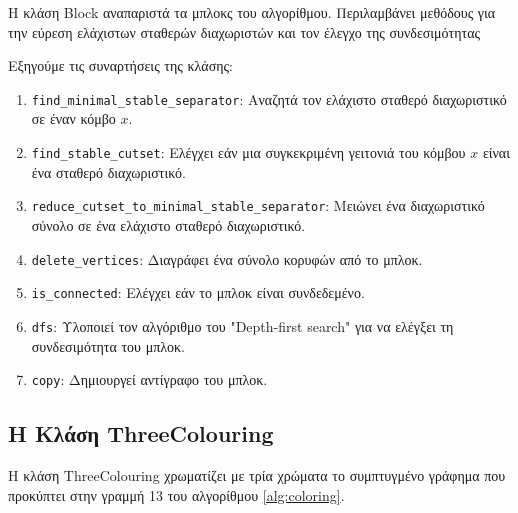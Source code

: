 Η κλάση Block αναπαριστά τα μπλοκς του αλγορίθμου. Περιλαμβάνει μεθόδους για την εύρεση ελάχιστων σταθερών διαχωριστών και τον έλεγχο της συνδεσιμότητας




Εξηγούμε τις συναρτήσεις της κλάσης:

\begin{enumerate}
	\item \texttt{find\_minimal\_stable\_separator}: Αναζητά τον ελάχιστο σταθερό διαχωριστικό σε έναν κόμβο $x$.
	
	\item \texttt{find\_stable\_cutset}: Ελέγχει εάν μια συγκεκριμένη γειτονιά του κόμβου $x$ είναι ένα σταθερό διαχωριστικό.
	
	\item \texttt{reduce\_cutset\_to\_minimal\_stable\_separator}: Μειώνει ένα διαχωριστικό σύνολο σε ένα ελάχιστο σταθερό διαχωριστικό.
	
	\item \texttt{delete\_vertices}: Διαγράφει ένα σύνολο κορυφών από το μπλοκ.
	
	\item \texttt{is\_connected}: Ελέγχει εάν το μπλοκ είναι συνδεδεμένο.
	
	\item \texttt{dfs}: Υλοποιεί τον αλγόριθμο του "Depth-first search" για να ελέγξει τη συνδεσιμότητα του μπλοκ.
	
	\item \texttt{copy}: Δημιουργεί αντίγραφο του μπλοκ.
\end{enumerate}

\subsection{H Kλάση ThreeColouring}

Η κλάση ThreeColouring χρωματίζει με τρία χρώματα το συμπτυγμένο γράφημα που προκύπτει στην γραμμή 13 του αλγορίθμου \ref{alg:coloring}.





